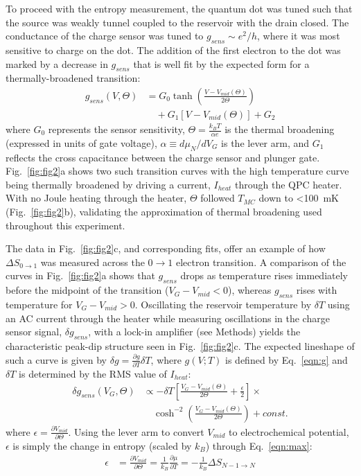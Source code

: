\documentclass[twocolumn,showpacs,amsmath,amssymb,prl,aps,superscriptaddress]{revtex4-1}
\begin{document}
To proceed with the entropy measurement, the quantum dot was tuned such that the source was weakly tunnel coupled to the reservoir with the drain closed.  The conductance of the charge sensor was tuned to $g_{sens}{\sim}e^2/h$, where it was most sensitive to charge on the dot.  The addition of the first electron to the dot was marked by a decrease in $g_{sens}$ that is well fit by the expected form for a thermally-broadened transition:
%
\begin{align}
\label{eqn:g}
        g_{sens}(V,\Theta) &= G_0 \tanh\left(\frac{V-V_{mid}(\Theta)}{2\Theta}\right)  \\
                        &\quad + G_1\left[V-V_{mid}(\Theta)\right] + G_2 \nonumber
\end{align}
%
where $G_0$ represents the sensor sensitivity, $\Theta = \frac{k_B T}{\alpha e}$ is the thermal broadening (expressed in units of gate voltage), $\alpha\equiv d \mu_{N}/d V_G$ is the lever arm, and $G_1$ reflects the cross capacitance between the charge sensor and plunger gate. Fig.~\ref{fig:fig2}a shows two such transition curves with the high temperature curve being thermally broadened by driving a current, $I_{heat}$ through the QPC heater. With no Joule heating through the heater, $\Theta$ followed $T_{MC}$ down to \SI{<100}{\milli\kelvin} (Fig.~\ref{fig:fig2}b), validating the approximation of thermal broadening used throughout this experiment.

The data in Fig.~\ref{fig:fig2}c, and corresponding fits, offer an example of how $\Delta S_{0\rightarrow 1}$ was measured across the $0 \rightarrow 1$ electron transition.  A comparison of the curves in Fig.~\ref{fig:fig2}a shows that $g_{sens}$ drops as temperature rises immediately before the midpoint of the transition ($V_G-V_{mid}<0$), whereas $g_{sens}$ rises with temperature for $V_G-V_{mid}>0$.   Oscillating the reservoir temperature by $\delta T$ using an AC current through the heater while measuring oscillations in the charge sensor signal, $\delta g_{sens}$, with a lock-in amplifier (see Methods) yields the characteristic peak-dip structure seen in Fig.~\ref{fig:fig2}c. The expected lineshape of such a curve is given by $\delta g = \frac{\partial g}{\partial T} \delta T$, where $g(V;T)$ is defined by Eq.~\ref{eqn:g} and $\delta T$ is determined by the RMS value of $I_{heat}$:
%
\begin{align}
\label{eqn:dg}
        \delta g_{sens}(V_G, \Theta) &\propto -\delta T \left[ \frac{V_G-V_{mid}(\Theta)}{2\Theta} + \frac{\epsilon}{2} \right]\times \\
        				      &\quad\cosh^{-2}\left(\frac{V_G-V_{mid}(\Theta)}{2\Theta}\right) + const. \nonumber
\end{align}
%
where $\epsilon=\frac{\partial V_{mid}}{\partial \Theta}$. Using the lever arm to convert $V_{mid}$ to electrochemical potential, $\epsilon$ is simply the change in entropy (scaled by $k_B$) through Eq.~\ref{eqn:max}:
%
% 
%
\begin{align}
\label{eqn:epsilon}
        \epsilon &= \frac{\partial V_{mid}}{\partial \Theta} = 
        \frac{1}{k_B} \frac{\partial \mu}{\partial T} = 
        -\frac{1}{k_B} \Delta S_{N-1\rightarrow N}
\end{align}
%
\end{document}
